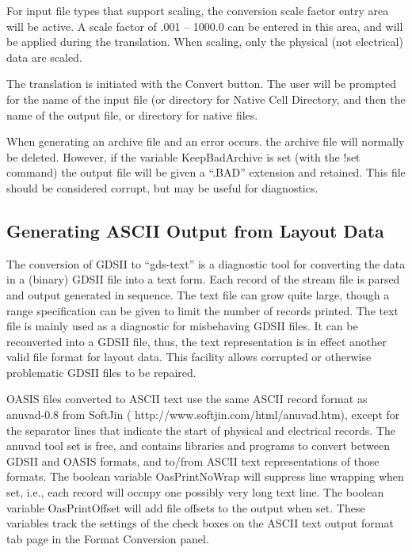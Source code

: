 For input file types that support scaling, the conversion scale factor
entry area will be active.  A scale factor of .001 -- 1000.0 can be
entered in this area, and will be applied during the translation. 
When scaling, only the physical (not electrical) data are scaled.

The translation is initiated with the {\cb Convert} button.  The user
will be prompted for the name of the input file (or directory for {\cb
Native Cell Directory}, and then the name of the output file, or
directory for native files.

When generating an archive file and an error occurs.  the archive file
will normally be deleted.  However, if the variable {\et
KeepBadArchive} is set (with the {\cb !set} command) the output file
will be given a ``{\vt .BAD}'' extension and retained.  This file
should be considered corrupt, but may be useful for diagnostics.


\subsection{Generating ASCII Output from Layout Data}
The conversion of GDSII to ``gds-text'' is a diagnostic tool for
converting the data in a (binary) GDSII file into a text form.  Each
record of the stream file is parsed and output generated in sequence. 
The text file can grow quite large, though a range specification can
be given to limit the number of records printed.  The text file is
mainly used as a diagnostic for misbehaving GDSII files.  It can be
reconverted into a GDSII file, thus, the text representation is in
effect another valid file format for layout data.  This facility
allows corrupted or otherwise problematic GDSII files to be repaired.

OASIS files converted to ASCII text use the same ASCII record format
as {\vt anuvad-0.8} from {\cb SoftJin} ({\vt
http://www.softjin.com/html/anuvad.htm}), except for the separator
lines that indicate the start of physical and electrical records.  The
{\vt anuvad} tool set is free, and contains libraries and programs to
convert between GDSII and OASIS formats, and to/from ASCII text
representations of those formats.  The boolean variable {\et
OasPrintNoWrap} will suppress line wrapping when set, i.e., each
record will occupy one possibly very long text line.  The boolean
variable {\et OasPrintOffset} will add file offsets to the output when
set.  These variables track the settings of the check boxes on the
{\cb ASCII text} output format tab page in the {\cb Format Conversion}
panel.

